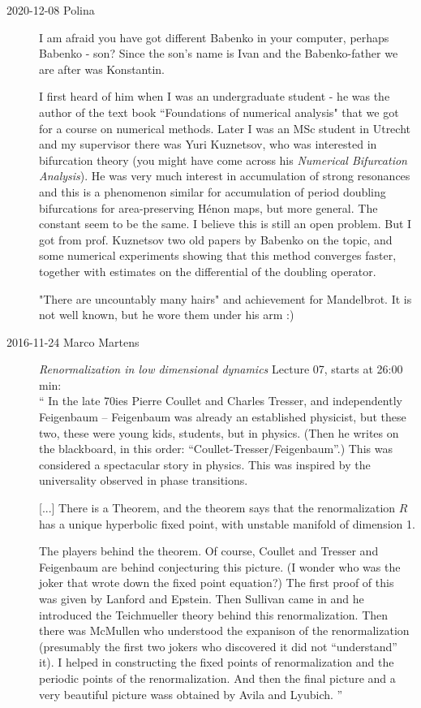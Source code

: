 \begin{description}
\item[2020-12-08 Polina]
I am afraid you have got different Babenko in your computer, perhaps
Babenko - 
{son}? Since the son's name is Ivan and the Babenko-father we are after
was Konstantin.

I first heard of him when I was an undergraduate student - he was the
author of the text book ``Foundations of numerical analysis" that we got
for a course on numerical methods. Later I was an MSc student in Utrecht
and my supervisor there was Yuri Kuznetsov, who was interested in
bifurcation theory (you might have come across his {\em
Numerical Bifurcation Analysis}). He was very much interest in
accumulation of strong resonances and this is a phenomenon similar for
accumulation of period doubling bifurcations for area-preserving H\'enon
maps, but more general. The constant seem to be the same. I believe this
is still an open problem. But I got from prof. Kuznetsov two old papers
by Babenko on the topic, and some numerical experiments showing that this
method converges faster, together with estimates on the differential of
the doubling operator.



"There are uncountably many hairs"
and achievement for Mandelbrot. It is not well known, but he wore them under his arm :)

\newpage %
\item[2016-11-24 Marco Martens]
\emph{Renormalization in low dimensional dynamics}
{Lecture 07}, starts at 26:00 min:
\\
``
In the late 70ies Pierre Coullet and Charles Tresser, and independently
Feigenbaum -- Feigenbaum was already an established physicist, but these
two, these were young kids, students, but in physics. (Then he writes on
the blackboard,  in this order: ``Coullet-Tresser/Feigenbaum''.) This was
considered a spectacular story in physics. This was inspired by the
universality observed in phase transitions.

[...]
There is a Theorem, and the theorem says that the renormalization $R$
has a unique hyperbolic fixed point, with unstable manifold of dimension 1.

The players behind the theorem. Of course, Coullet and Tresser and
Feigenbaum are behind conjecturing this picture. (I wonder
who was the joker that wrote down the fixed point equation?) The first
proof of this was given by {Lanford} and
Epstein. Then Sullivan came in and he
introduced the Teichmueller theory behind this renormalization. Then
there was McMullen who understood the expanison of the
renormalization (presumably the first two jokers who discovered it did
not ``understand'' it). I helped in constructing the fixed points of
renormalization and the periodic points of the
renormalization. And then the final
picture and a very beautiful picture wass obtained by Avila and
Lyubich.
''


\end{description}
